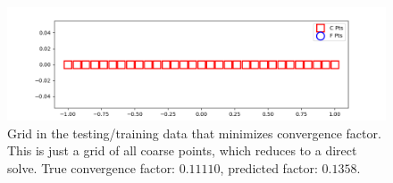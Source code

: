 \begin{figure}[h]
  \centering
  \includegraphics[scale=0.7]{figures/jacobi-conv/conv_opt_grid_in_data.png}
  \caption{Grid in the testing/training data that minimizes convergence factor.  This is just a grid of all coarse points, which reduces to a direct solve.  True convergence factor: $0.11110$, predicted factor: $0.1358$.}
  \label{fig:optimized_grid_in_data}
\end{figure}


